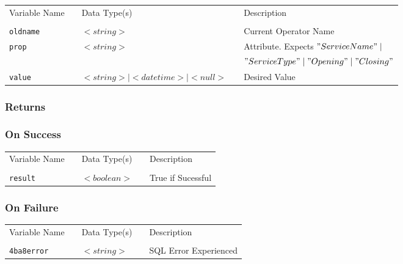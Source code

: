\begin{tabular}{lllll}
Variable Name	&		&	Data Type(s)		&	&	Description	\\
				&	&	&	&	\\
\verb!oldname! & \hspace{15mm} & $<string>$ & \hspace{15mm} & Current Operator Name \\
\verb!prop! & \hspace{15mm} & $<string>$ 	& \hspace{15mm} & Attribute. Expects  $"ServiceName" \mid$ \\
	&	&	&	&	$"ServiceType"  \mid "Opening" \mid "Closing"$\\
\verb!value! & \hspace{15mm} & $<string> \mid <datetime> \mid <null>$ & \hspace{15mm} & Desired Value \\
\end{tabular}

\subsubsection{Returns}

\subsubsection{On Success}

\begin{tabular}{lllll}
Variable Name	&		&	Data Type(s)		&	&	Description	\\
				&	&	&	&	\\
\verb!result! & \hspace{15mm} & $<boolean>$ & \hspace{15mm} & True if Sucessful \\
\end{tabular}

\subsubsection{On Failure}

\begin{tabular}{lllll}
Variable Name	&		&	Data Type(s)		&	&	Description	\\
				&	&	&	&	\\
\verb!4ba8error! & \hspace{15mm} & $<string>$ & \hspace{15mm} & SQL Error Experienced \\
\end{tabular}


